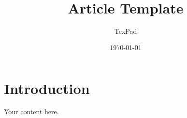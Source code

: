 \documentclass[11pt,a4paper]{article}
\title{Article Template}
\author{TexPad}
\date{\today}
\begin{document}
\maketitle
\section{Introduction}
Your content here.
\end{document}
